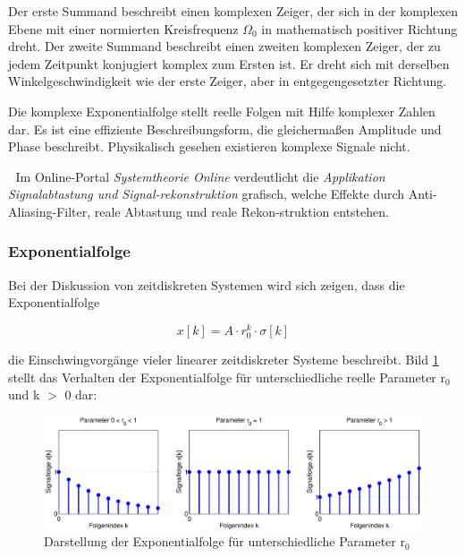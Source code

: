 \noindent Der erste Summand beschreibt einen komplexen Zeiger, der sich in der komplexen Ebene mit einer normierten Kreisfrequenz $\Omega_{0}$ in mathematisch positiver Richtung dreht. Der zweite Summand beschreibt einen zweiten komplexen Zeiger, der zu jedem Zeitpunkt konjugiert komplex zum Ersten ist. Er dreht sich mit derselben Winkelgeschwindigkeit wie der erste Zeiger, aber in entgegengesetzter Richtung. 

\clearpage

\noindent Die komplexe Exponentialfolge stellt reelle Folgen mit Hilfe komplexer Zahlen dar. Es ist eine effiziente Beschreibungsform, die gleicherma{\ss}en Amplitude und Phase beschreibt. Physikalisch gesehen existieren komplexe Signale nicht.

\textcolor{white}{.}\newline
\noindent Im Online-Portal \textit{Systemtheorie Online} verdeutlicht die \textit{Applikation Signalabtastung und Signal-rekonstruktion} grafisch, welche Effekte durch Anti-Aliasing-Filter, reale Abtastung und reale Rekon-struktion entstehen.\newline   

\subsubsection{Exponentialfolge}

\noindent Bei der Diskussion von zeitdiskreten Systemen wird sich zeigen, dass die Exponentialfolge 

\begin{equation}\label{eq:threesixtyone}
x\left[k\right]=A\cdot r_{0}^{k} \cdot \sigma \left[k\right]
\end{equation}

\noindent die Einschwingvorg\"{a}nge vieler linearer zeitdiskreter Systeme beschreibt. Bild \ref{fig:ExponentialFolgeunParam} stellt das Verhalten der Exponentialfolge f\"{u}r unterschiedliche reelle Parameter r${}_{0}$ und k $\mathrm{>}$ 0 dar:

\begin{figure}[H]
  \centerline{\includegraphics[width=1\textwidth]{Kapitel3/Bilder/image22.eps}}
  \caption{Darstellung der Exponentialfolge f\"{u}r unterschiedliche Parameter r${}_{0}$}
  \label{fig:ExponentialFolgeunParam}
\end{figure}

